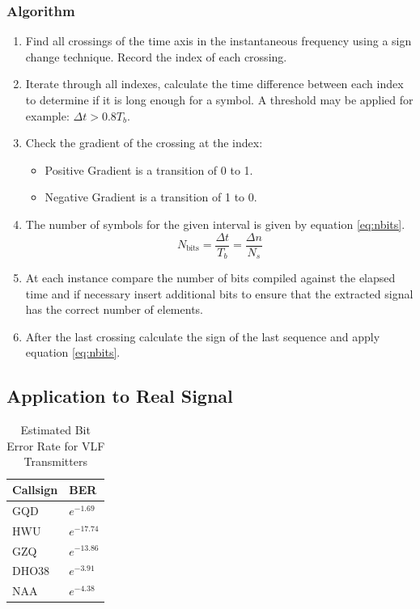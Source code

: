 \subsubsection{Algorithm}
\begin{enumerate}
    \item Find all crossings of the time axis in the instantaneous frequency using a sign change technique. Record the index of each crossing.
    \item Iterate through all indexes, calculate the time difference between each index to determine if it is long enough for a symbol. A threshold may be applied for example: $\Delta t > 0.8T_b$.
    \item Check the gradient of the crossing at the index:
    \begin{itemize}
        \item Positive Gradient is a transition of 0 to 1.
        \item Negative Gradient is a transition of 1 to 0.
    \end{itemize}
    \item The number of symbols for the given interval is given by equation \ref{eq:nbits}. 
    \begin{equation}
        N_{\text{bits}} = \frac{\Delta t}{T_b} = \frac{\Delta n}{N_s}
        \label{eq:nbits}
    \end{equation}
    \item At each instance compare the number of bits compiled against the elapsed time and if necessary insert additional bits to ensure that the extracted signal has the correct number of elements.
    \item After the last crossing calculate the sign of the last sequence and apply equation \ref{eq:nbits}.
\end{enumerate}


\subsection{Application to Real Signal}
\begin{table}[h!]
    \centering
    \begin{tabular}{l|l}
    Callsign & BER           \\
    \hline
    GQD      & $e^{-1.69}$  \\
    HWU      & $e^{-17.74}$ \\
    GZQ      & $e^{-13.86}$ \\
    DHO38    & $e^{-3.91}$  \\
    NAA      & $e^{-4.38}$ 
    \end{tabular}
    \caption{Estimated Bit Error Rate for VLF Transmitters}
    \label{tab:BER Real}
\end{table}

